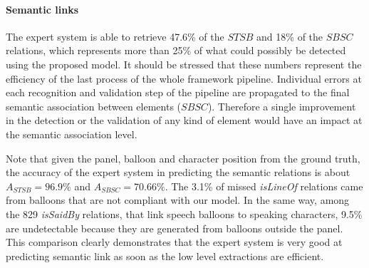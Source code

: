 
\paragraph{Semantic links} %
\label{sec:semantic_links_evaluation}

The expert system is able to retrieve 47.6\% of the $STSB$ and 18\% of the $SBSC$ relations, which represents more than 25\% of what could possibly be detected using the proposed model.
It should be stressed that these numbers represent the efficiency of the last process of the whole framework pipeline.
Individual errors at each recognition and validation step of the pipeline are propagated to the final semantic association between elements ($SBSC$).
Therefore a single improvement in the detection or the validation of any kind of element would have an impact at the semantic association level.

Note that given the panel, balloon and character position from the ground truth, the accuracy of the expert system in predicting the semantic relations is about $A_{STSB}=96.9\%$ and $A_{SBSC}=70.66\%$.
The 3.1\% of missed \emph{isLineOf} relations came from balloons that are not compliant with our model.
In the same way, among the 829 \emph{isSaidBy} relations, that link speech balloons to speaking characters, 9.5\% are undetectable because they are generated from balloons outside the panel.
This comparison clearly demonstrates that the expert system is very good at predicting semantic link as soon as the low level extractions are efficient.










